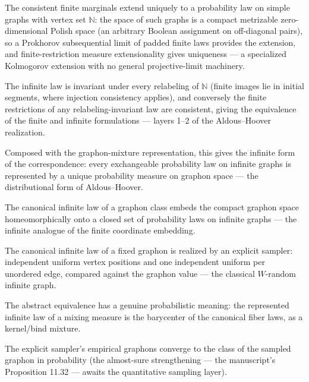 The consistent finite marginals extend uniquely to a probability law on simple graphs
with vertex set $\mathbb{N}$: the space of such graphs is a compact metrizable
zero-dimensional Polish space (an arbitrary Boolean assignment on off-diagonal pairs),
so a Prokhorov subsequential limit of padded finite laws provides the extension, and
finite-restriction measure extensionality gives uniqueness — a specialized Kolmogorov
extension with no general projective-limit machinery.


The infinite law is invariant under every relabeling of $\mathbb{N}$ (finite images lie
in initial segments, where injection consistency applies), and conversely the finite
restrictions of any relabeling-invariant law are consistent, giving the equivalence of
the finite and infinite formulations — layers 1--2 of the Aldous--Hoover realization.


Composed with the graphon-mixture representation, this gives the infinite form of the
correspondence: every exchangeable probability law on infinite graphs is represented by
a unique probability measure on graphon space — the distributional form of
Aldous--Hoover.


The canonical infinite law of a graphon class embeds the compact graphon space
homeomorphically onto a closed set of probability laws on infinite graphs — the
infinite analogue of the finite coordinate embedding.


The canonical infinite law of a fixed graphon is realized by an explicit sampler:
independent uniform vertex positions and one independent uniform per unordered edge,
compared against the graphon value — the classical $W$-random infinite graph.


The abstract equivalence has a genuine probabilistic meaning: the represented infinite
law of a mixing measure is the barycenter of the canonical fiber laws, as a
kernel/bind mixture.


The explicit sampler's empirical graphons converge to the class of the sampled graphon
in probability (the almost-sure strengthening — the manuscript's Proposition 11.32 —
awaits the quantitative sampling layer).

